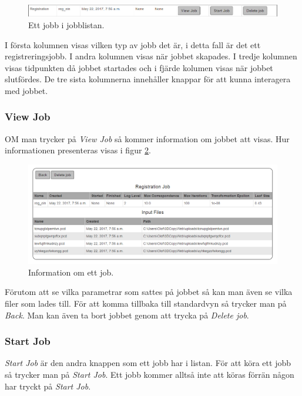 \documentclass[a4paper,titlepage,12pt]{article}
\begin{document}
	\begin{figure}[H]
		\centering
		\includegraphics[width=160mm]{images/job_in_list.PNG}
		\caption{Ett jobb i jobblistan.}
		\label{fig:job_in_list}
	\end{figure}

	I första kolumnen visas vilken typ av jobb det är, i detta fall är det ett registreringsjobb. I andra kolumnen visas när jobbet skapades. I tredje kolumnen visas tidpunkten då jobbet startades och i fjärde kolumen visas när jobbet slutfördes. De tre sista kolumnerna innehåller knappar för att kunna interagera med jobbet.
	
	\subsubsection{View Job}
	
	OM man trycker på \textit{View Job} så kommer information om jobbet att visas. Hur informationen presenteras visas i figur \ref{fig:view_job}.
	
	\begin{figure}[H]
		\centering
		\includegraphics[width=160mm]{images/view_job.PNG}
		\caption{Information om ett job.}
		\label{fig:view_job}
	\end{figure}

	Förutom att se vilka parametrar som sattes på jobbet så kan man även se vilka filer som lades till. För att komma tillbaka till standardvyn så trycker man på \textit{Back}. Man kan även ta bort jobbet genom att trycka på \textit{Delete job}.
	
	\subsubsection{Start Job}
	
	\textit{Start Job} är den andra knappen som ett jobb har i listan. För att köra ett jobb så trycker man på \textit{Start Job}. Ett jobb kommer alltså inte att köras förrän någon har tryckt på \textit{Start Job}.
	
\end{document}
